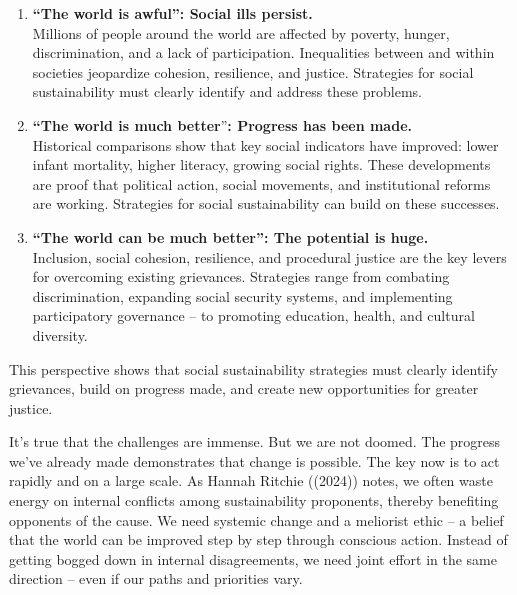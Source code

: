 \documentclass[
  a4paper,
  openany]{book}
\begin{document}
\begin{enumerate}
\def\labelenumi{\arabic{enumi}.}
\item
  \textbf{``The world is awful'': Social ills persist.}\\
  Millions of people around the world are affected by poverty, hunger,
  discrimination, and a lack of participation. Inequalities between and
  within societies jeopardize cohesion, resilience, and justice.
  Strategies for social sustainability must clearly identify and address
  these problems.
\item
  \textbf{``The world is much better}''\textbf{: Progress has been
  made.}\\
  Historical comparisons show that key social indicators have improved:
  lower infant mortality, higher literacy, growing social rights. These
  developments are proof that political action, social movements, and
  institutional reforms are working. Strategies for social
  sustainability can build on these successes.
\item
  \textbf{``The world can be much better'': The potential is huge.}\\
  Inclusion, social cohesion, resilience, and procedural justice are the
  key levers for overcoming existing grievances. Strategies range from
  combating discrimination, expanding social security systems, and
  implementing participatory governance -- to promoting education,
  health, and cultural diversity.
\end{enumerate}

This perspective shows that social sustainability strategies must
clearly identify grievances, build on progress made, and create new
opportunities for greater justice.

It's true that the challenges are immense. But we are not doomed. The
progress we've already made demonstrates that change is possible. The
key now is to act rapidly and on a large scale. As Hannah Ritchie
((2024)) notes, we often waste energy on internal conflicts among
sustainability proponents, thereby benefiting opponents of the cause. We
need systemic change and a meliorist ethic -- a belief that the world
can be improved step by step through conscious action. Instead of
getting bogged down in internal disagreements, we need joint effort in
the same direction -- even if our paths and priorities vary.
\end{document}
